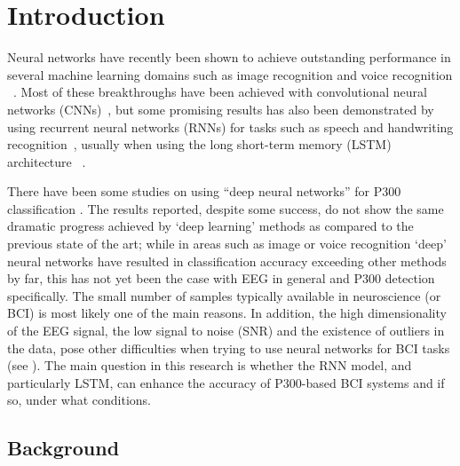 \documentclass[
12pt, %
english, %
doublespacing, %
headsepline, %
]{MastersDoctoralThesis} %
\begin{document}

\chapter{Introduction}

\vspace{0.4cm}

Neural networks have recently been shown to achieve outstanding performance in several machine learning domains such as image recognition \cite{krizhevsky2012imagenet} and voice recognition ~\cite{hinton2012deep}. Most of these breakthroughs have been achieved with convolutional neural networks (CNNs)~\cite{Lenet98}, but some promising results has also been demonstrated by using recurrent neural networks (RNNs) for tasks such as speech and handwriting recognition~\cite{graves2013speech, graves2008unconstrained}, usually when using the long short-term memory (LSTM) architecture ~\cite{LSTM_origin}.

There have been some studies on using ``deep neural networks'' for P300 classification \cite{P300_CNN, RSVP_P300_geva}. The results reported, despite some success, do not show the same dramatic progress achieved by `deep learning' methods as compared to the previous state of the art; while in areas such as image or voice recognition `deep' neural networks have resulted in classification accuracy exceeding other methods by far, this has not yet been the case with EEG in general and P300 detection specifically. The small number of samples typically available in neuroscience (or BCI) is most likely one of the main reasons. In addition, the high dimensionality of the EEG signal, the low signal to noise (SNR) and the existence of outliers in the data, pose other difficulties when trying to use neural networks for BCI tasks (see \cite{lotte2007review}). The main question in this research is whether the RNN model, and particularly LSTM, can enhance the accuracy of P300-based BCI systems and if so, under what conditions.

\vspace{0.4cm}
\section{Background}
\vspace{0.4cm}
\end{document}
